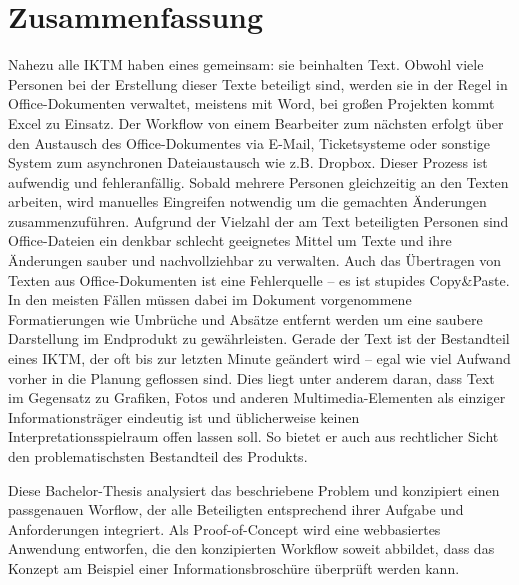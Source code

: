 \section*{Zusammenfassung}

Nahezu alle \ac{IKTM} haben eines gemeinsam: sie beinhalten Text. Obwohl viele Personen bei der Erstellung dieser Texte beteiligt sind, werden sie in der Regel in Office-Dokumenten verwaltet, meistens mit Word, bei großen Projekten kommt Excel zu Einsatz. Der Workflow von einem Bearbeiter zum nächsten erfolgt über den Austausch des Office-Dokumentes via E-Mail, Ticketsysteme oder sonstige System zum asynchronen Dateiaustausch wie z.B. Dropbox. Dieser Prozess ist aufwendig und fehleranfällig. Sobald mehrere Personen gleichzeitig an den Texten arbeiten, wird manuelles Eingreifen notwendig um die gemachten Änderungen zusammenzuführen. Aufgrund der Vielzahl der am Text beteiligten Personen sind Office-Dateien ein denkbar schlecht geeignetes Mittel um Texte und ihre Änderungen sauber und nachvollziehbar zu verwalten. Auch das Übertragen von Texten aus Office-Dokumenten ist eine Fehlerquelle – es ist stupides Copy\&\-Paste. In den meisten Fällen müssen dabei im Dokument vorgenommene Formatierungen wie Umbrüche und Absätze entfernt werden um eine saubere Darstellung im Endprodukt zu gewährleisten. Gerade der Text ist der Bestandteil eines \ac{IKTM}, der oft bis zur letzten Minute geändert wird – egal wie viel Aufwand vorher in die Planung geflossen sind. Dies liegt unter anderem daran, dass Text im Gegensatz zu Grafiken, Fotos und anderen Multimedia-Elementen als einziger Informationsträger eindeutig ist und üblicherweise keinen Interpretationsspielraum offen lassen soll. So bietet er auch aus rechtlicher Sicht den problematischsten Bestandteil des Produkts.

Diese Bachelor-Thesis analysiert das beschriebene Problem und konzipiert einen passgenauen Worflow, der alle Beteiligten entsprechend ihrer Aufgabe und Anforderungen integriert. Als Proof-of-Concept wird eine webbasiertes Anwendung entworfen, die den konzipierten Workflow soweit abbildet, dass das Konzept am Beispiel einer Informationsbroschüre überprüft werden kann. 


